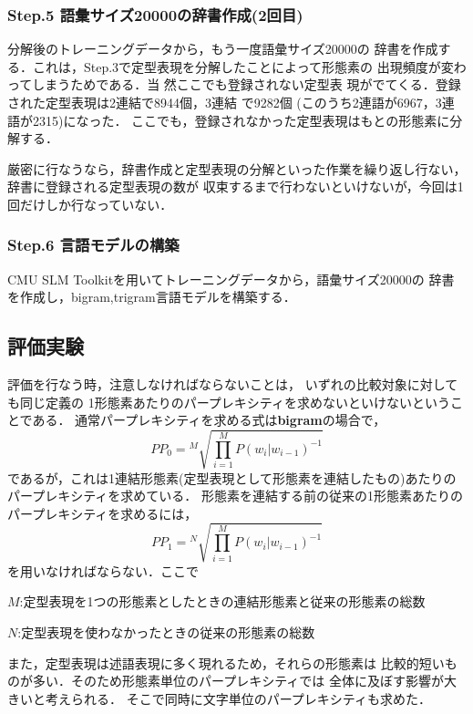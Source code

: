 \subsubsection*{Step.5 語彙サイズ20000の辞書作成(2回目)}
分解後のトレーニングデータから，もう一度語彙サイズ20000の
辞書を作成する．これは，Step.3で定型表現を分解したことによって形態素の
出現頻度が変わってしまうためである．当\break
然ここでも登録されない定型表
現がでてくる．登録された定型表現は2連結で8944個，3連結\break
で9282個
(このうち2連語が6967，3連語が2315)になった．
ここでも，\mbox{登録されなかった定型}表現はもとの形態素に分解する．

厳密に行なうなら，辞書作成と定型表現の分解といった作業を繰り返し行ない，
辞書に登録される定型表現の数が
収束するまで行わないといけないが，今回は1回だけしか行なっていない．

\subsubsection*{Step.6 言語モデルの構築}
CMU SLM Toolkitを用いてトレーニングデータから，語彙サイズ20000の
辞書を作成し，bigram,trigram言語モデルを構築する．

\subsection{評価実験}

評価を行なう時，注意しなければならないことは，
いずれの比較対象に対しても同じ定義の
1形態素あたりのパープレキシティを求めないといけないということである．
\mbox{通常パープレキシ}ティを求める式は{\bf bigram}の場合で，
\begin{equation}
PP_0 = {}^M\sqrt{\prod_{i=1}^MP(w_i|w_{i-1})^{-1}}
\end{equation}
であるが，これは1連結形態素(定型表現として形態素を連結したもの)あたりの
パープレキシティを求めている．
形態素を連結する前の従来の1形態素あたりのパープレキシティを求めるには，
\begin{equation}
PP_1 = {}^{N}\sqrt{\prod_{i=1}^MP(w_i|w_{i-1})^{-1}}
\end{equation}
を用いなければならない．ここで

$M$:定型表現を1つの形態素としたときの連結形態素と従来の形態素の総数

$N$:定型表現を使わなかったときの従来の形態素の総数

また，定型表現は述語表現に多く現れるため，それらの形態素は
比較的短いものが多い．そのため形態素単位のパープレキシティでは
全体に及ぼす影響が大きいと考えられる．
そこで同時に文字単位のパープレキシティも求めた．

